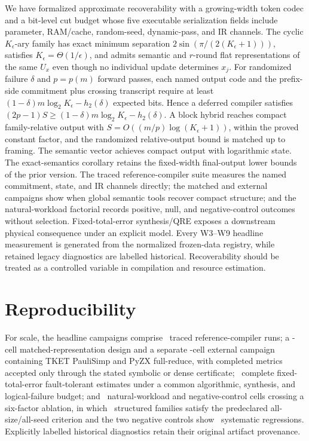 \documentclass[aps,prx,reprint,floatfix,superscriptaddress]{revtex4-2}
\begin{document}
We have formalized approximate recoverability with a growing-width token
codec and a bit-level cut budget whose five executable serialization fields
include parameter, RAM/cache, random-seed, dynamic-pass, and IR channels.
The cyclic $K_\epsilon$-ary family has exact minimum separation
$2\sin(\pi/(2(K_\epsilon+1)))$, satisfies
$K_\epsilon=\Theta(1/\epsilon)$, and admits semantic and $r$-round flat
representations of the same $U_x$ even though no individual update
determines $x_j$.  For randomized failure $\delta$ and $p=p(m)$ forward
passes, each named output code and the prefix-side commitment plus crossing
transcript require at least
$(1-\delta)m\log_2K_\epsilon-h_2(\delta)$ expected bits.  Hence a deferred
compiler satisfies $(2p-1)S\geq
(1-\delta)m\log_2K_\epsilon-h_2(\delta)$.  A block hybrid reaches compact
family-relative output with
$S=O((m/p)\log(K_\epsilon+1))$, within the proved constant factor, and the
randomized relative-output bound is matched up to framing.  The semantic
  vector achieves compact output with logarithmic state.  The exact-semantics
  corollary retains the fixed-width final-output lower bounds of the prior
  version.  The traced reference-compiler suite measures the named commitment,
  state, and IR channels directly; the matched and external campaigns show when
  global semantic tools recover compact structure; and the natural-workload
  factorial records positive, null, and negative-control outcomes without
  selection.  Fixed-total-error synthesis/QRE exposes a downstream physical
  consequence under an explicit model.  Every W3--W9 headline measurement is
  generated from the normalized frozen-data registry, while retained legacy
  diagnostics are labelled historical.  Recoverability should be treated
  as a controlled variable in compilation and resource estimation.


\section*{Reproducibility}
\label{sec:reproducibility}

For scale, the headline campaigns comprise \TradeoffRuns\ traced
reference-compiler runs; a \MatchedCells-cell matched-representation
design and a separate \ExternalCells-cell external campaign containing
TKET PauliSimp and PyZX full-reduce, with completed metrics accepted
only through the stated symbolic or dense certificate; \QRECells\
complete fixed-total-error fault-tolerant estimates under a common
algorithmic, synthesis, and logical-failure budget; and \NaturalCells\
natural-workload and negative-control cells crossing a six-factor
ablation, in which \NaturalStableFamilies\ structured families satisfy
the predeclared all-size/all-seed criterion and the two negative
controls show \NaturalNegativeRegressions\ systematic regressions.
Explicitly labelled historical diagnostics retain their original
artifact provenance.
\end{document}
